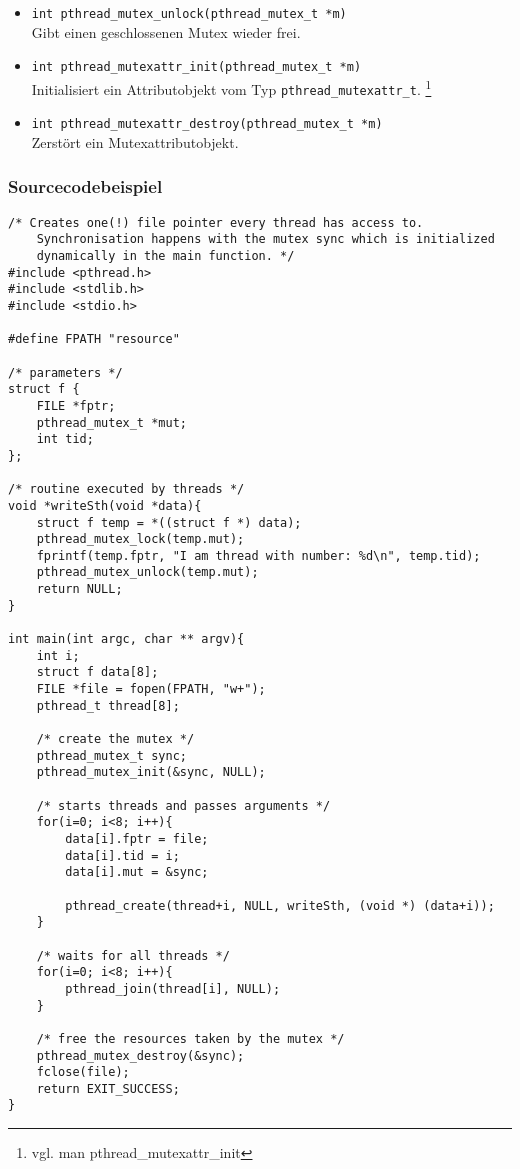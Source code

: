 \documentclass[11pt,a4paper]{article}
\begin{document}
\begin{itemize}
\item \lstinline$int pthread_mutex_unlock(pthread_mutex_t *m)$ \\
Gibt einen geschlossenen Mutex wieder frei.

\item \lstinline$int pthread_mutexattr_init(pthread_mutex_t *m)$ \\
Initialisiert ein Attributobjekt vom Typ \lstinline$pthread_mutexattr_t$. \footnote{vgl. man pthread\_mutexattr_init}

\item \lstinline$int pthread_mutexattr_destroy(pthread_mutex_t *m)$ \\
Zerstört ein Mutexattributobjekt.

\end{itemize}

\subsubsection{Sourcecodebeispiel}
\begin{lstlisting}[name=Mutex]
/* Creates one(!) file pointer every thread has access to. 
	Synchronisation happens with the mutex sync which is initialized
	dynamically in the main function. */
#include <pthread.h>
#include <stdlib.h>
#include <stdio.h>

#define FPATH "resource"

/* parameters */
struct f {
	FILE *fptr;
	pthread_mutex_t *mut;
	int tid;
};

/* routine executed by threads */
void *writeSth(void *data){
	struct f temp = *((struct f *) data);
	pthread_mutex_lock(temp.mut);
	fprintf(temp.fptr, "I am thread with number: %d\n", temp.tid);
	pthread_mutex_unlock(temp.mut);
	return NULL;
}

int main(int argc, char ** argv){
	int i;
	struct f data[8];
	FILE *file = fopen(FPATH, "w+");
	pthread_t thread[8];

	/* create the mutex */
	pthread_mutex_t sync; 
	pthread_mutex_init(&sync, NULL);

	/* starts threads and passes arguments */
	for(i=0; i<8; i++){
		data[i].fptr = file;
		data[i].tid = i;
		data[i].mut = &sync;

		pthread_create(thread+i, NULL, writeSth, (void *) (data+i));
	}

	/* waits for all threads */
	for(i=0; i<8; i++){
		pthread_join(thread[i], NULL);
	}

	/* free the resources taken by the mutex */
	pthread_mutex_destroy(&sync);
	fclose(file);
	return EXIT_SUCCESS;
}
\end{lstlisting}
\end{document}
